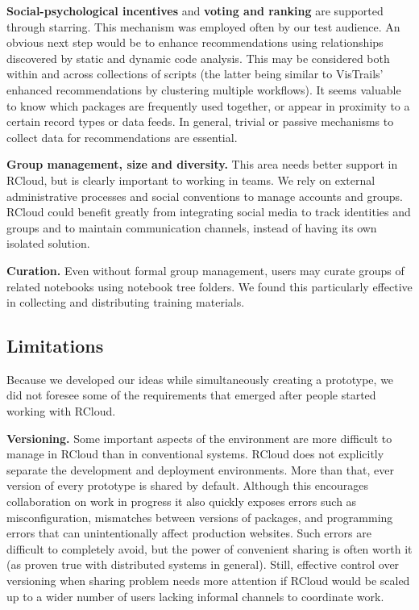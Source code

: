{\bf Social-psychological incentives} and {\bf voting and ranking} are supported
through starring. This mechanism was employed often by our test
audience.  An obvious next step would be to enhance recommendations using
relationships discovered by static and dynamic code analysis. This may be
considered both within and across collections of scripts (the latter being
similar to VisTrails' enhanced recommendations by clustering multiple
workflows).  It seems valuable to know which packages are frequently used
together, or appear in proximity to a certain record types or data feeds.  In
general, trivial or passive mechanisms to collect data for recommendations are
essential.

{\bf Group management, size and diversity.} This area needs better
support in RCloud, but is clearly important to working in teams.
We rely on external administrative processes and social conventions
to manage accounts and groups. RCloud could benefit greatly from
integrating social media to track identities and groups and to maintain
communication channels, instead of having its own isolated solution.

{\bf Curation.} Even without formal group management, users may
curate groups of related notebooks using notebook tree folders.
We found this particularly effective in collecting and distributing
training materials.

\subsection{Limitations}
Because we developed our ideas while simultaneously creating a prototype,
we did not foresee some of the requirements that emerged after
people started working with RCloud.

{\bf Versioning.}
Some important aspects of the environment are more difficult to manage
in RCloud than in conventional systems. RCloud does not explicitly
separate the development and deployment environments. More than that,
ever version of every prototype is shared by default. Although this encourages
collaboration on work in progress it also quickly exposes errors such as
misconfiguration, mismatches between versions of packages, and programming
errors that can unintentionally affect production websites. Such errors
are difficult to completely avoid, but the power of convenient sharing is often
worth it (as proven true with distributed systems in general).
Still, effective control over versioning when sharing problem needs more
attention if RCloud would be scaled up to a wider number of users lacking
informal channels to coordinate work.

